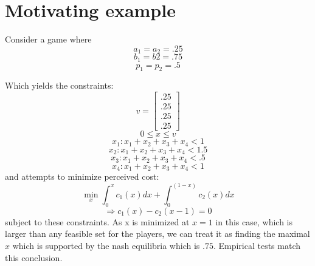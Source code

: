 \documentclass[12pt]{article}
\begin{document}
 \section{Motivating example}
 Consider a game where 
 \[a_1 = a_2 = .25\]\[b_1 = b2 =.75\]
 \[p_1=p_2 = .5\]
 
 Which yields the constraints:
 \[v = \left[ \begin{array}{c}.25 \\ .25 \\ .25\\ .25 \end{array}\right]  \]
\[0 \leq x \leq v\]
 \[x_1: x_1+x_2+x_3+x_4   < 1 \]
 \[x_2:x_1+x_2+x_3+x_4  < 1.5 \]
 \[x_3: x_1+x_2+x_3+x_4  < .5 \]
 \[x_4: x_1+x_2+x_3+x_4  < 1 \]
 and attempts to minimize perceived cost: 
\[ \min_x \int_0^x c_1(x) dx + \int_0^(1-x) c_2(x)dx\]
\[ \Rightarrow c_1(x) - c_2(x-1) =0\] 
subject to these constraints.
As x is minimized at $x=1$ in this case, which is larger than any feasible set for the players, we can treat it as finding the maximal $x$ which is supported by the nash equilibria which is $.75$. Empirical tests match this conclusion.
\end{document}
